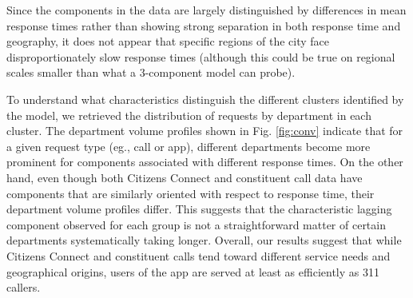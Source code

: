\documentclass[twoside]{article}
\theoremstyle{theorem}
\theoremstyle{theorem}
\theoremstyle{theorem}
\theoremstyle{lemma}
\theoremstyle{definition}
\theoremstyle{example}
\begin{document}
Since the components in the data are largely distinguished by differences in mean response times rather than showing strong separation in both response time and geography, it does not appear that specific regions of the city face disproportionately slow response times (although this could be true on regional scales smaller than what a 3-component model can probe). 

To understand what characteristics distinguish the different clusters identified by the model, we retrieved the distribution of requests by department in each cluster. The department volume profiles shown in Fig. \ref{fig:conv} indicate that for a given request type (eg., call or app), different departments become more prominent for components associated with different response times. On the other hand, even though both Citizens Connect and constituent call data have components that are similarly oriented with respect to response time, their department volume profiles differ. This suggests that the characteristic lagging component observed for each group is not a straightforward matter of certain departments systematically taking longer.  Overall, our results suggest that while Citizens Connect and constituent calls tend toward different service needs and geographical origins, users of the app are served at least as efficiently as 311 callers.




\end{document}
